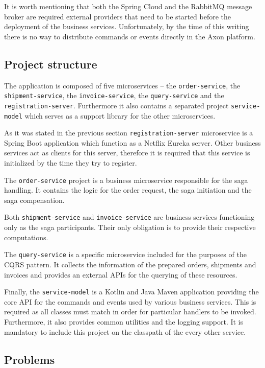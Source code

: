 \documentclass[oneside,
  digital, %
  table,   %
  nolof,     %
  nolot,     %
]{fithesis3}
\begin{document}
It is worth mentioning that both the Spring Cloud and the RabbitMQ message broker are required external providers that need to be started before the deployment of the business services. Unfortunately, by the time of this writing there is no way to distribute commands or events directly in the Axon platform.

\subsection{Project structure}

The application is composed of five microservices -- the  \texttt{order-service}, the \texttt{shipment-service}, the \texttt{invoice-service}, the \texttt{query-service} and the \texttt{registration-server}. Furthermore it also contains a separated project \texttt{service-model} which serves as a support library for the other microservices.

As it was stated in the previous section \texttt{registration-server} microservice is a Spring Boot application which function as a Netflix Eureka server. Other business services act as clients for this server, therefore it is required that this service is initialized by the time they try to register.

The \texttt{order-service} project is a business microservice responsible for the saga handling. It contains the logic for the order request, the saga initiation and the saga compensation.

Both \texttt{shipment-service} and \texttt{invoice-service} are business services functioning only as the saga participants. Their only obligation is to provide their respective computations.

The \texttt{query-service} is a specific microservice included for the purposes of the CQRS pattern. It collects the information of the prepared orders, shipments and invoices and provides an external APIs for the querying of these resources. 

Finally, the \texttt{service-model} is a Kotlin and Java Maven application providing the core API for the commands and events used by various business services. This is required as all classes must match in order for particular handlers to be invoked. Furthermore, it also provides common utilities and the logging support. It is mandatory to include this project on the classpath of the every other service.

\subsection{Problems}
\label{sec:axon-problems}
\end{document}
